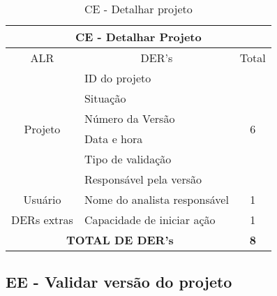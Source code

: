       \begin{table}[!h]
      \centering
      \caption{CE - Detalhar projeto}
      \label{ce_detalhar_projeto}
      \begin{tabular}{|c|l|c|}
      \hline
      \multicolumn{3}{|c|}{CE - Detalhar Projeto}                                  \\ \hline
      ALR                      & \multicolumn{1}{c|}{DER's}   & Total              \\ \hline
      \multirow{6}{*}{Projeto} & ID do projeto                & \multirow{6}{*}{6} \\ \cline{2-2}
			      & Situação                     &                    \\ \cline{2-2}
			      & Número da Versão             &                    \\ \cline{2-2}
			      & Data e hora                  &                    \\ \cline{2-2}
			      & Tipo de validação            &                    \\ \cline{2-2}
			      & Responsável pela versão      &                    \\ \hline
      Usuário                  & Nome do analista responsável & 1                  \\ \hline
      DERs extras              & Capacidade de iniciar ação   & 1                  \\ \hline
      \multicolumn{2}{|c|}{\textbf{TOTAL DE DER's}}           & \textbf{8}         \\ \hline
      \end{tabular}
      \end{table}
      
   \subsection{EE - Validar versão do projeto}
   
